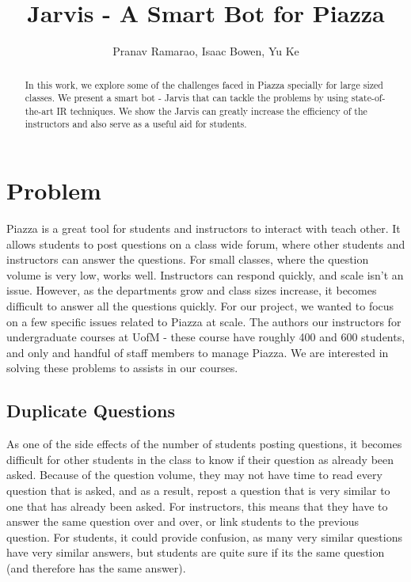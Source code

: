 \documentclass[sigconf]{acmart}
\begin{document}
\title{Jarvis - A Smart Bot for Piazza}
\author{Pranav Ramarao, Isaac Bowen, Yu Ke}


\renewcommand{\shortauthors}{B. Trovato et al.}


\begin{abstract}
In this work, we explore some of the challenges faced in Piazza specially for large sized classes. We present a smart bot - Jarvis that can tackle the problems by using state-of-the-art IR techniques. We show the Jarvis can greatly increase the efficiency of the instructors and also serve as a useful aid for students.
\end{abstract}


\maketitle

\section{Problem}
Piazza is a great tool for students and instructors to interact with teach other. It allows students to post questions on a class wide forum, where other students and instructors can answer the questions. For small classes, where the question volume is very low, works well. Instructors can respond quickly, and scale isn't an issue. However, as the departments grow and class sizes increase, it becomes difficult to answer all the questions quickly. For our project, we wanted to focus on a few specific issues related to Piazza at scale. The authors our instructors for undergraduate courses at UofM - these course have roughly 400 and 600 students, and only and handful of staff members to manage Piazza. We are interested in solving these problems to assists in our courses.

\subsection{Duplicate Questions}
As one of the side effects of the number of students posting questions, it becomes difficult for other students in the class to know if their question as already been asked. Because of the question volume, they may not have time to read every question that is asked, and as a result, repost a question that is very similar to one that has already been asked. For instructors, this means that they have to answer the same question over and over, or link students to the previous question. For students, it could provide confusion, as many very similar questions have very similar answers, but students are quite sure if its the same question (and therefore has the same answer).
\end{document}
